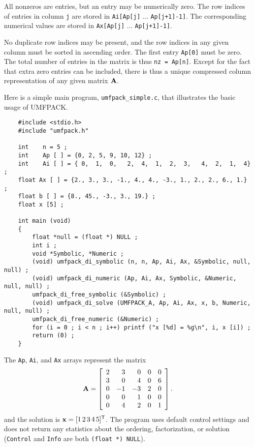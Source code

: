 \documentclass[11pt]{article}
\newcommand{\m}[1]{{\bf{#1}}}       %
\newcommand{\tr}{^{\sf T}}          %
\begin{document}
All nonzeros are entries, but an entry may be numerically zero.  The row indices
of entries in column {\tt j} are stored in
    {\tt Ai[Ap[j]} ... {\tt Ap[j+1]-1]}.
The corresponding numerical values are stored in
    {\tt Ax[Ap[j]} ... {\tt Ap[j+1]-1]}.

No duplicate row indices may be present, and the row indices in any given
column must be sorted in ascending order.  The first entry {\tt Ap[0]} must be
zero.  The total number of entries in the matrix is thus {\tt nz = Ap[n]}.
Except for the fact that extra zero entries can be included, there is thus a
unique compressed column representation of any given matrix $\m{A}$.

Here is a simple main program, {\tt umfpack\_simple.c}, that illustrates the
basic usage of UMFPACK.

{\footnotesize
\begin{verbatim}
    #include <stdio.h>
    #include "umfpack.h"

    int    n = 5 ;
    int    Ap [ ] = {0, 2, 5, 9, 10, 12} ;
    int    Ai [ ] = { 0,  1,  0,   2,  4,  1,  2,  3,   4,  2,  1,  4} ;
    float Ax [ ] = {2., 3., 3., -1., 4., 4., -3., 1., 2., 2., 6., 1.} ;
    float b [ ] = {8., 45., -3., 3., 19.} ;
    float x [5] ;

    int main (void)
    {
        float *null = (float *) NULL ;
        int i ;
        void *Symbolic, *Numeric ;
        (void) umfpack_di_symbolic (n, n, Ap, Ai, Ax, &Symbolic, null, null) ;
        (void) umfpack_di_numeric (Ap, Ai, Ax, Symbolic, &Numeric, null, null) ;
        umfpack_di_free_symbolic (&Symbolic) ;
        (void) umfpack_di_solve (UMFPACK_A, Ap, Ai, Ax, x, b, Numeric, null, null) ;
        umfpack_di_free_numeric (&Numeric) ;
        for (i = 0 ; i < n ; i++) printf ("x [%d] = %g\n", i, x [i]) ;
        return (0) ;
    }
\end{verbatim}
}

The {\tt Ap}, {\tt Ai}, and {\tt Ax} arrays represent the matrix
\[
\m{A} = \left[
\begin{array}{rrrrr}
 2 &  3 &  0 &  0 &  0 \\
 3 &  0 &  4 &  0 &  6 \\
 0 & -1 & -3 &  2 &  0 \\
 0 &  0 &  1 &  0 &  0 \\
 0 &  4 &  2 &  0 &  1 \\
\end{array}
\right].
\]
and the solution is $\m{x} = [1 \, 2 \, 3 \, 4 \, 5]\tr$.  The program uses
default control settings and does not return any statistics about the ordering,
factorization, or solution ({\tt Control} and {\tt Info} are both
{\tt (float *) NULL}).
\end{document}
